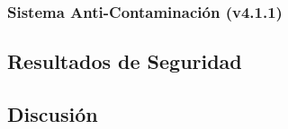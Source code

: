 \subsubsection{Sistema Anti-Contaminaci\'on (v4.1.1)}
\label{subsubsec:anti-contaminacion}


\subsection{Resultados de Seguridad}
\label{subsec:resultados-seguridad}


\subsection{Discusi\'on}
\label{subsec:discusion}

